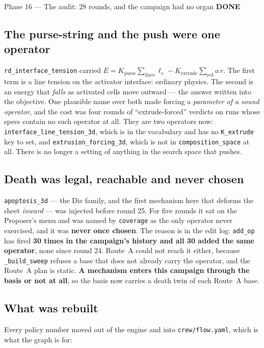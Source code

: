\documentclass[11pt,a4paper]{article}
\newcommand{\code}[1]{\texttt{#1}}
\newcommand{\done}{\textcolor{good}{\textbf{DONE}}}
\begin{document}
\begin{phasebox}{Phase 16 --- The audit: 28 rounds, and the campaign had no organ \hfill \done}
\subsection*{The purse-string and the push were one operator}
\code{rd\_interface\_tension} carried $E = K_{\mathrm{purse}}\sum_{\mathrm{iface}} \ell_e -
K_{\mathrm{extrude}}\sum_{\mathrm{red}} a\,r$. The first term is a line tension on the activator
interface: ordinary physics. The second is an energy that \emph{falls} as activated cells move
outward --- the answer written into the objective. One plausible name over both made forcing a
\emph{parameter of a sound operator}, and the cost was four rounds of ``extrude-forced'' verdicts
on runs whose specs contain no such operator at all. They are two operators now:
\code{interface\_line\_tension\_3d}, which is in the vocabulary and has no \code{K\_extrude} key to
set, and \code{extrusion\_forcing\_3d}, which is not in \code{composition\_space} at all. There is
no longer a setting of anything in the search space that pushes.

\subsection*{Death was legal, reachable and never chosen}
\code{apoptosis\_3d} --- the Die family, and the first mechanism here that deforms the sheet
\emph{inward} --- was injected before round 25. For five rounds it sat on the Proposer's menu and
was named by \code{coverage} as the only operator never exercised, and it was \textbf{never once
chosen}. The reason is in the edit log: \code{add\_op} has fired \textbf{30 times in the campaign's
history and all 30 added the same operator}, none since round 24. Route~A could not reach it
either, because \code{\_build\_sweep} refuses a base that does not already carry the operator, and
the Route~A plan is static. \textbf{A mechanism enters this campaign through the basis or not at
all}, so the basis now carries a death twin of each Route~A base.

\subsection*{What was rebuilt}
Every policy number moved out of the engine and into \code{crew/flow.yaml}, which is what the graph
is for:


\end{phasebox}
\end{document}

